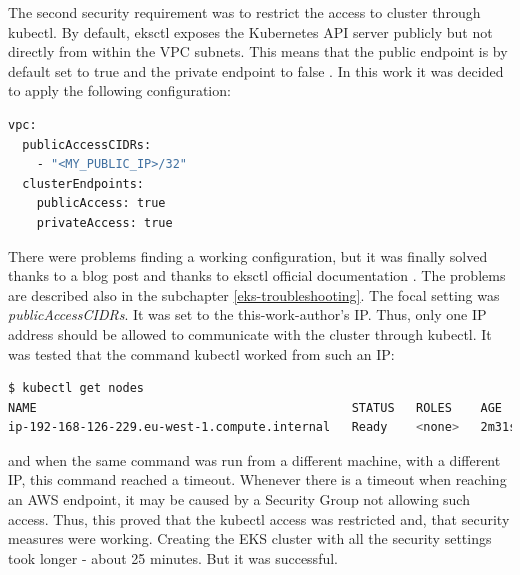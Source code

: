 The second security requirement was to restrict the access to cluster through kubectl. By default, eksctl exposes the Kubernetes API server publicly but not directly from within the VPC subnets. This means that the public endpoint is by default set to true and the private endpoint to false \cite{eksctl-net}. In this work it was decided to apply the following configuration:
\begin{lstlisting}[basicstyle=\tiny,caption={Eksctl configuration applying security measures},captionpos=b,language=Bash,xleftmargin=1cm]
vpc:
  publicAccessCIDRs:
    - "<MY_PUBLIC_IP>/32"
  clusterEndpoints:
    publicAccess: true
    privateAccess: true
\end{lstlisting}
There were problems finding a working configuration, but it was finally solved thanks to a blog post \cite{eksctl-net-issue-solution} and thanks to eksctl official documentation \cite{eksctl-net}. The problems are described also in the subchapter \ref{eks-troubleshooting}. The focal setting was \textit{publicAccessCIDRs}. It was set to the this-work-author's IP. Thus, only one IP address should be allowed to communicate with the cluster through kubectl. It was tested that the command kubectl worked from such an IP:
\begin{lstlisting}[basicstyle=\tiny,caption={Verifying connection to API server},captionpos=b,language=Bash,xleftmargin=1cm]
$ kubectl get nodes
NAME                                            STATUS   ROLES    AGE     VERSION
ip-192-168-126-229.eu-west-1.compute.internal   Ready    <none>   2m31s   v1.16.8-eks-e16311
\end{lstlisting}
and when the same command was run from a different machine, with a different IP, this command reached a timeout. Whenever there is a timeout when reaching an AWS endpoint, it may be caused by a Security Group not allowing such access. Thus, this proved that the kubectl access was restricted and, that security measures were working. Creating the EKS cluster with all the security settings took longer - about 25 minutes. But it was successful.

